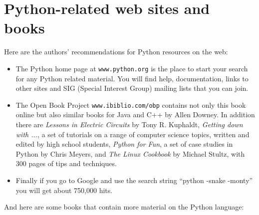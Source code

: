 \section{Python-related web sites and books}

Here are the authors' recommendations for Python resources
on the web:

\begin{itemize}

\item The Python home page at {\tt www.python.org} is the place to start 
your search for any Python related material.  You will find
help, documentation, links to other sites and SIG (Special Interest
Group) mailing lists that you can join.

\item The Open Book Project {\tt www.ibiblio.com/obp} contains not
only this book online but also similar books for Java and C++ by Allen
Downey.  In addition there are {\em
Lessons in Electric Circuits} by Tony R.  Kuphaldt, 
{\em Getting down
with ...}, a set of tutorials on a range of computer science topics,
written and edited by high school students, {\em Python for Fun},
a set of case studies in Python by Chris Meyers, and {\em The Linux
Cookbook} by Michael Stultz, with 300 pages of tips and techniques.

\item Finally if you go to Google and use the search 
string ``python -snake -monty'' you will get about 750,000 hits.

\end{itemize}

\pagebreak

And here are some books that contain more material on the
Python language:

